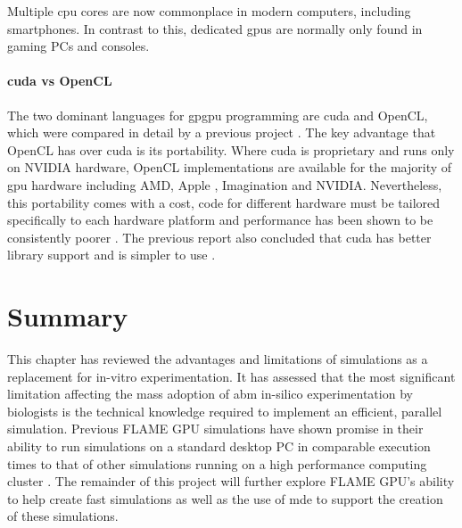 \documentclass{UoYCSproject}
\begin{document}

Multiple \acrshort{cpu} cores are now commonplace in modern computers, including smartphones.
In contrast to this, dedicated \acrshort{gpu}s are normally only found in gaming PCs and consoles.

\paragraph{\acrshort{cuda} vs OpenCL}
The two dominant languages for \gls{gpgpu} programming are \gls{cuda} and OpenCL, which were compared in detail by a previous project \cite{phil_diss}.
The key advantage that OpenCL has over \acrshort{cuda} is its portability.
Where \acrshort{cuda} is proprietary and runs only on NVIDIA hardware, OpenCL implementations are available for the majority of \gls{gpu} hardware including AMD, Apple \cite{apple_opencl}, Imagination and NVIDIA. \cite{opencl_conformance}
Nevertheless, this portability comes with a cost, code for different hardware must be tailored specifically to each hardware platform and performance has been shown to be consistently poorer \cite{cuda_v_opencl}.
The previous report also concluded that \gls{cuda} has better library support and is simpler to use \cite{phil_diss}.


\section{Summary}
This chapter has reviewed the advantages and limitations of simulations as a replacement for \gls{in-vitro} experimentation.
It has assessed that the most significant limitation affecting the mass adoption of \gls{abm} \gls{in-silico} experimentation by biologists is the technical knowledge required to implement an efficient, parallel simulation.
Previous \gls{FLAME GPU} simulations have shown promise in their ability to run simulations on a standard desktop PC in comparable execution times to that of other simulations running on a high performance computing cluster \cite{flame_keratinocyte}.
The remainder of this project will further explore \gls{FLAME GPU}'s ability to help create fast simulations as well as the use of \gls{mde} to support the creation of these simulations.
\end{document}

